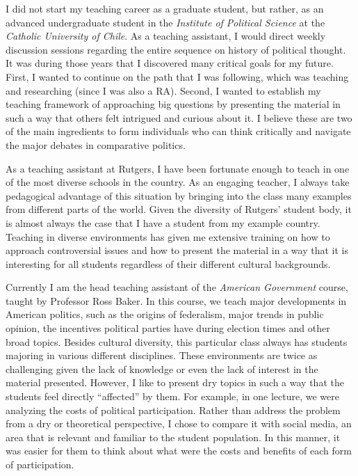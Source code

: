\documentclass[11pt]{letter} %
\begin{document}
\begin{letter}{}
I did not start my teaching career as a graduate student, but rather, as an advanced undergraduate student in the \emph{Institute of Political Science} at the \emph{Catholic University of Chile}. As a teaching assistant, I would direct weekly discussion sessions regarding the entire sequence on history of political thought. It was during those years that I discovered many critical goals for my future. First, I wanted to continue on the path that I was following, which was teaching and researching (since I was also a RA). Second, I wanted to establish my teaching framework of approaching big questions by presenting the material in such a way that others felt intrigued and curious about it. I believe these are two of the main ingredients to form individuals who can think critically and navigate the major debates in comparative politics. 

As a teaching assistant at Rutgers, I have been fortunate enough to teach in one of the most diverse schools in the country. As an engaging teacher, I always take pedagogical advantage of this situation by bringing into the class many examples from different parts of the world. Given the diversity of Rutgers' student body, it is almost always the case that I have a student from my example country. Teaching in diverse environments has given me extensive training on how to approach controversial issues and how to present the material in a way that it is interesting for all students regardless of their different cultural backgrounds. 

Currently I am the head teaching assistant of the \emph{American Government} course, taught by Professor Ross Baker. In this course, we teach major developments in American politics, such as the origins of federalism, major trends in public opinion, the incentives political parties have during election times and other broad topics. Besides cultural diversity, this particular class always has students majoring in various different disciplines. These environments are twice as challenging given the lack of knowledge or even the lack of interest in the material presented. However, I like to present dry topics in such a way that the students feel directly ``affected'' by them. For example, in one lecture, we were analyzing the costs of political participation. Rather than address the problem from a dry or theoretical perspective, I chose to compare it with social media, an area that is relevant and familiar to the student population. In this manner, it was easier for them to think about what were the costs and benefits of each form of participation. 


\end{letter}
\end{document}
